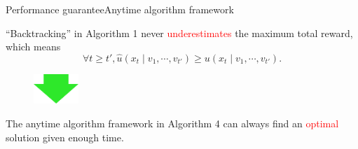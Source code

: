 \begin{frame}{Performance guarantee}{Anytime algorithm framework}

\begin{lemma}
“Backtracking” in Algorithm 1 never \textcolor{red}{underestimates}
the maximum total reward, which means
\begin{equation}
\nonumber
\forall t \geq t', \hat{u}(x_{t} \mid v_{1} , \cdots , v_{t'}) \geq u(x_{t} \mid v_{1} , \cdots , v_{t'}).
\end{equation}
\end{lemma}

\begin{minipage}{\textwidth}
\begin{figure}
\centering
\includegraphics[width = 0.15\textwidth]{./figure/arrow}
\end{figure}
\end{minipage}

\begin{theorem}
The anytime algorithm framework in Algorithm 4 can always find an \textcolor{red}{optimal} solution given enough time.
\end{theorem}

\end{frame}